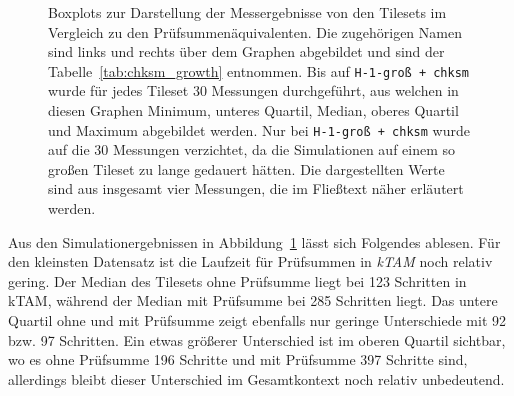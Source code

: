 \begin{figure}
\begin{subfigure}[b]{0.49\textwidth}
    \end{subfigure}
    \caption[Simulationsergebnisse für Prüfsummen in Assemblies]{Boxplots zur Darstellung der Messergebnisse von den Tilesets im Vergleich zu den Prüfsummenäquivalenten. Die zugehörigen Namen sind links und rechts über dem Graphen abgebildet und sind der Tabelle~\ref{tab:chksm_growth} entnommen. Bis auf \texttt{H-1-groß + chksm} wurde für jedes Tileset 30 Messungen durchgeführt, aus welchen in diesen Graphen Minimum, unteres Quartil, Median, oberes Quartil und Maximum abgebildet werden. Nur bei \texttt{H-1-groß + chksm} wurde auf die 30 Messungen verzichtet, da die Simulationen auf einem so großen Tileset zu lange gedauert hätten. Die dargestellten Werte sind aus insgesamt vier Messungen, die im Fließtext näher erläutert werden.}
    \label{fig:chksm_simulation}
\end{figure}

Aus den Simulationergebnissen in Abbildung~\ref{fig:chksm_simulation} lässt sich Folgendes ablesen. Für den kleinsten Datensatz ist die Laufzeit für Prüfsummen in \emph{kTAM} noch relativ gering. Der Median des Tilesets ohne Prüfsumme liegt bei 123 Schritten in kTAM, während der Median mit Prüfsumme bei 285 Schritten liegt. Das untere Quartil ohne und mit Prüfsumme zeigt ebenfalls nur geringe Unterschiede mit 92 bzw. 97 Schritten. Ein etwas größerer Unterschied ist im oberen Quartil sichtbar, wo es ohne Prüfsumme 196 Schritte und mit Prüfsumme 397 Schritte sind, allerdings bleibt dieser Unterschied im Gesamtkontext noch relativ unbedeutend.

